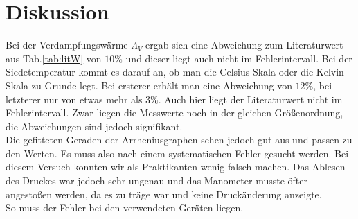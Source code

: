 \documentclass[12pt,a4paper,titlepage,headinclude,bibtotoc]{scrartcl}
\begin{document}
\section{Diskussion}
\label{sec:diskussion}
Bei der Verdampfungswärme $\Lambda_V$ ergab sich eine Abweichung zum Literaturwert aus Tab.\ref{tab:litW} von $10\%$ und dieser liegt auch nicht im Fehlerintervall.
Bei der Siedetemperatur kommt es darauf an, ob man die Celsius-Skala oder die Kelvin-Skala zu Grunde legt.
Bei ersterer erhält man eine Abweichung von $12\%$, bei letzterer nur von etwas mehr als $3\%$.
Auch hier liegt der Literaturwert nicht im Fehlerintervall.
Zwar liegen die Messwerte noch in der gleichen Größenordnung, die Abweichungen sind jedoch signifikant.\\
Die gefitteten Geraden der Arrheniusgraphen sehen jedoch gut aus und passen zu den Werten.
Es muss also nach einem systematischen Fehler gesucht werden.
Bei diesem Versuch konnten wir als Praktikanten wenig falsch machen.
Das Ablesen des Druckes war jedoch sehr ungenau und das Manometer musste öfter angestoßen werden, da es zu träge war und keine Druckänderung anzeigte.\\
So muss der Fehler bei den verwendeten Geräten liegen.





\end{document}
